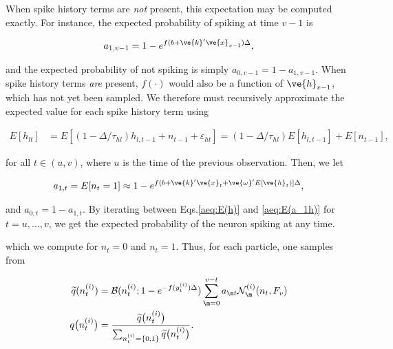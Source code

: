 When spike history terms are \emph{not} present, this expectation may be computed exactly.  For instance, the expected probability of spiking at time $v-1$ is

\begin{align} \label{aeq:E(a_1)}
a_{1,v-1} = 1-e^{f(b+\ve{k}'\ve{x}_{v-1})\Delta},
\end{align}

\noindent and the expected probability of not spiking is simply $a_{0,v-1}=1-a_{1,v-1}$.  When spike history terms \emph{are} present, $f(\cdot)$ would also be a function of $\ve{h}_{v-1}$, which has not yet been sampled.  We therefore must recursively approximate the expected value for each spike history term using

\begin{align} \label{aeq:E(h)}
E[h_{lt}] &= E\left[(1-\Delta/\tau_{hl}) h_{l,t-1} + n_{t-1} + \varepsilon_{ht}\right]  = (1-\Delta/\tau_{hl}) E[h_{l,t-1}] + E[n_{t-1}],
\end{align}

\noindent for all $t\in(u,v)$, where $u$ is the time of the previous observation. Then, we let

\begin{align} \label{aeq:E(a_1h)}
a_{1,t} = E[n_{t}=1] \approx 1-e^{f(b+\ve{k}'\ve{x}_t + \ve{\omega}'E[\ve{h}_t)]\Delta},
\end{align}

\noindent and $a_{0,t}=1-a_{1,t}$. By iterating between Eqs.\ref{aeq:E(h)} and \ref{aeq:E(a_1h)} for $t=u,\ldots,v$, we get the expected probability of the neuron spiking at any time.





\noindent which we compute for $n_t=0$ and $n_t=1$.  Thus, for each particle, one samples from

\begin{subequations} \label{aeq:qn}
\begin{align}
\widetilde{q}(n_t^{(i)})&=\mathcal{B}(n_t^{(i)}; 1-e^{-f(y_t^{(i)}) \Delta}) \sum_{\m=0}^{v-t} a_{\m t} \mathcal{N}_{\m}^{(i)}(n_t, F_v)\\
q\big(n_t^{(i)}\big)&=\frac{\widetilde{q}\big(n_t^{(i)}\big)}{\sum_{n_t^{(i)}=\{0,1\}} \widetilde{q}\big(n_t^{(i)}\big)}.
\end{align}
\end{subequations}

